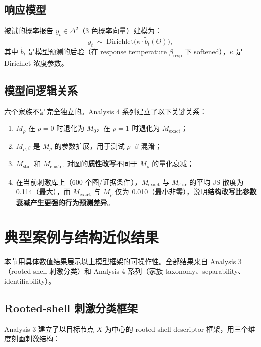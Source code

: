 \documentclass[11pt,a4paper]{ctexart}
\begin{document}
\subsection{响应模型}

被试的概率报告 $y_t\in\Delta^2$（3 色概率向量）建模为：
\begin{equation}
\label{eq:response}
y_t \;\sim\; \mathrm{Dirichlet}\!\bigl(\kappa\cdot\tilde{b}_t(\Theta)\bigr),
\end{equation}
其中 $\tilde{b}_t$ 是模型预测的后验（在 response temperature $\beta_\mathrm{resp}$ 下 softened），$\kappa$ 是 Dirichlet 浓度参数。

\subsection{模型间逻辑关系}

六个家族不是完全独立的。Analysis 4 系列建立了以下关键关系：
\begin{enumerate}
    \item $M_\rho$ 在 $\rho=0$ 时退化为 $M_0$，在 $\rho=1$ 时退化为 $M_\mathrm{exact}$；
    \item $M_{\rho,\beta}$ 是 $M_\rho$ 的参数扩展，用于测试 $\rho$--$\beta$ 混淆；
    \item $M_\mathrm{star}$ 和 $M_\mathrm{cluster}$ 对图的\textbf{质性改写}不同于 $M_\rho$ 的量化衰减；
    \item 在当前刺激库上（600 个图/证据条件），$M_\mathrm{exact}$ 与 $M_\mathrm{star}$ 的平均 JS 散度为 0.114（最大），而 $M_\mathrm{exact}$ 与 $M_\rho$ 仅为 0.010（最小非零），说明\textbf{结构改写比参数衰减产生更强的行为预测差异}。
\end{enumerate}


\section{典型案例与结构近似结果}
\label{sec:cases}

本节用具体数值结果展示以上模型框架的可操作性。全部结果来自 Analysis 3（rooted-shell 刺激分类）和 Analysis 4 系列（家族 taxonomy、separability、identifiability）。

\subsection{Rooted-shell 刺激分类框架}

Analysis 3 建立了以目标节点 $X$ 为中心的 rooted-shell descriptor 框架，用三个维度刻画刺激结构：
\end{document}

